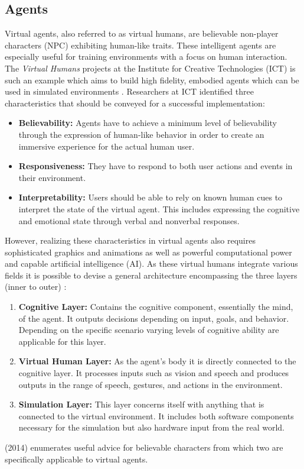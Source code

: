\subsection{Agents}
Virtual agents, also referred to as virtual humans, are believable non-player characters (NPC) exhibiting human-like traits.
These intelligent agents are especially useful for training environments with a focus on human interaction.
The \emph{Virtual Humans} projects at the Institute for Creative Technologies (ICT) is such an example which aims to build high fidelity, embodied agents which can be used in simulated environments \cite{Kenny2007}.
Researchers at ICT identified three characteristics that should be conveyed for a successful implementation:
\begin{itemize}
    \item \textbf{Believability:} Agents have to achieve a minimum level of believability through the expression of human-like behavior in order to create an immersive experience for the actual human user.
    \item \textbf{Responsiveness:} They have to respond to both user actions and events in their environment.
    \item \textbf{Interpretability:} Users should be able to rely on known human cues to interpret the state of the virtual agent. This includes expressing the cognitive and emotional state through verbal and nonverbal responses.
\end{itemize}
However, realizing these characteristics in virtual agents also requires sophisticated graphics and animations as well as powerful computational power and capable artificial intelligence (AI).
As these virtual humans integrate various fields it is possible to devise a general architecture encompassing the three layers (inner to outer) \cite{Kenny2007}:
\begin{enumerate}
    \item \textbf{Cognitive Layer:} Contains the cognitive component, essentially the mind, of the agent. It outputs decisions depending on input, goals, and behavior. Depending on the specific scenario varying levels of cognitive ability are applicable for this layer.
    \item \textbf{Virtual Human Layer:} As the agent's body it is directly connected to the cognitive layer. It processes inputs such as vision and speech and produces outputs in the range of speech, gestures, and actions in the environment.
    \item \textbf{Simulation Layer:} This layer concerns itself with anything that is connected to the virtual environment.  It includes both software components necessary for the simulation but also hardware input from the real world. 
\end{enumerate} 
\citeauthor{Schell2014} (2014) enumerates useful advice for believable characters from which two are specifically applicable to virtual agents.

